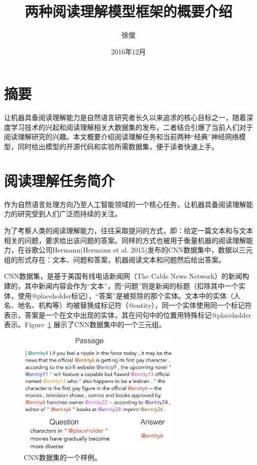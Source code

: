 \documentclass[11pt]{article}
\title{两种阅读理解模型框架的概要介绍}
\author{徐俊}
\date{2016年12月}
\begin{document}
\maketitle

\section{摘要}
让机器具备阅读理解能力是自然语言研究者长久以来追求的核心目标之一，随着深度学习技术的兴起和阅读理解相关大数据集的发布，二者结合引爆了当前人们对于阅读理解研究的兴趣。本文概要介绍阅读理解任务和当前两种“经典”神经网络模型，同时给出模型的开源代码和实验所需数据集，便于读者快速上手。

\section{阅读理解任务简介}
作为自然语言处理方向乃至人工智能领域的一个核心任务，让机器具备阅读理解能力的研究受到人们广泛而持续的关注。

为了考察人类的阅读理解能力，往往采取提问的方式，即：给定一篇文本和与文本相关的问题，要求给出该问题的答案。同样的方式也被用于衡量机器的阅读理解能力，在谷歌公司Hermann(Hermann et al. 2015)\cite{hermann2015teaching}发布的CNN数据集中，数据以三元组的形式存在：文本、问题和答案，机器阅读文本和问题然后给出答案。

CNN数据集，是基于美国有线电话新闻网（The Cable News Network）的新闻构建的，其中新闻内容会作为“文本”，而“问题”则是新闻的标题（扣除其中一个实体，使用@placeholder标记），“答案”是被抠除的那个实体。文本中的实体（人名、地名、机构等）均被替换成标记符（@entity），同一个实体使用同一个标记符表示，答案是一个在文中出现的实体，其在问句中的位置用特殊标记@placeholder表示。Figure~\ref{fig:1} 展示了CNN数据集中的一个三元组。

\begin{figure}[htbp]
\begin{center}
	\includegraphics[width=80mm]{picture/CNN.jpg}
	\caption{CNN数据集的一个样例\cite{chen2016thorough}。}
	\label{fig:1}
\end{center}
\end{figure}
\end{document}
